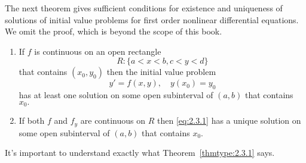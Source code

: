 \documentclass{ximera}
\begin{document}
The next theorem gives sufficient conditions for existence and
uniqueness of solutions of initial value problems for first order
nonlinear differential equations. We omit the proof, which is beyond
the scope of this book.

\begin{theorem}\label{thmtype:2.3.1} 
\begin{enumerate}
\item\label{thmtype:2.3.1a}
 If  $f$ is continuous
on an open rectangle
$$
R:  \{ a < x < b, c < y < d \}
$$
 that contains $(x_0,y_0)$
then  the initial value problem
\begin{equation} \label{eq:2.3.1}
y'=f(x,y), \quad y(x_0)=y_0
\end{equation}
 has at least one solution  on some open subinterval
of  $(a,b)$ that contains $x_0.$

\item\label{thmtype:2.3.1b}
 If  both $f$ and  $f_y$ are
 continuous on $R$ then \eqref{eq:2.3.1} has a unique
solution on some open subinterval  of $(a,b)$ that contains $x_0$.
\end{enumerate}
\end{theorem}


It's important to understand exactly what Theorem~\ref{thmtype:2.3.1}
says.
\end{document}

